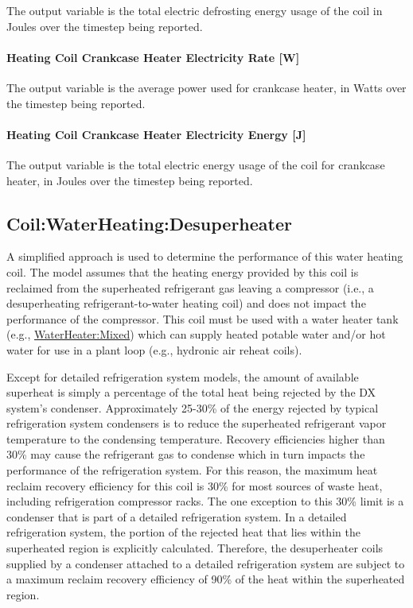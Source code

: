 The output variable is the total electric defrosting energy usage of the coil in Joules over the timestep being reported.

\paragraph{Heating Coil Crankcase Heater Electricity Rate {[}W{]}}\label{heating-coil-crankcase-heater-electric-power-w-2}

The output variable is the average power used for crankcase heater, in Watts over the timestep being reported.

\paragraph{Heating Coil Crankcase Heater Electricity Energy {[}J{]}}

The output variable is the total electric energy usage of the coil for crankcase heater, in Joules over the timestep being reported.

\subsection{Coil:WaterHeating:Desuperheater}\label{coilwaterheatingdesuperheater}

A simplified approach is used to determine the performance of this water heating coil. The model assumes that the heating energy provided by this coil is reclaimed from the superheated refrigerant gas leaving a compressor (i.e., a desuperheating refrigerant-to-water heating coil) and does not impact the performance of the compressor. This coil must be used with a water heater tank (e.g., \hyperref[waterheatermixed]{WaterHeater:Mixed}) which can supply heated potable water and/or hot water for use in a plant loop (e.g., hydronic air reheat coils).

Except for detailed refrigeration system models, the amount of available superheat is simply a percentage of the total heat being rejected by the DX system's condenser. Approximately 25-30\% of the energy rejected by typical refrigeration system condensers is to reduce the superheated refrigerant vapor temperature to the condensing temperature. Recovery efficiencies higher than 30\% may cause the refrigerant gas to condense which in turn impacts the performance of the refrigeration system. For this reason, the maximum heat reclaim recovery efficiency for this coil is 30\% for most sources of waste heat, including refrigeration compressor racks. The one exception to this 30\% limit is a condenser that is part of a detailed refrigeration system. In a detailed refrigeration system, the portion of the rejected heat that lies within the superheated region is explicitly calculated. Therefore, the desuperheater coils supplied by a condenser attached to a detailed refrigeration system are subject to a maximum reclaim recovery efficiency of 90\% of the heat within the superheated region.

